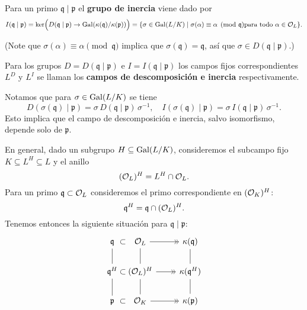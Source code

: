 \begin{definicion}
  Para un primo $\mathfrak{q} \mid \mathfrak{p}$ el \textbf{grupo de inercia}
  viene dado por
  \[ I (\mathfrak{q} \mid \mathfrak{p})
  = \ker \Bigl(D (\mathfrak{q} \mid \mathfrak{p}) \to \operatorname{Gal} (\kappa(\mathfrak{q}) / \kappa(\mathfrak{p}))\Bigr)
  = \{ \sigma \in \operatorname{Gal} (L/K) \mid \sigma (\alpha) \equiv \alpha \pmod{\mathfrak{q}}
  \text{para todo }\alpha \in \mathcal{O}_L \}. \]
\end{definicion}

\noindent (Note que $\sigma (\alpha) \equiv \alpha \pmod{\mathfrak{q}}$ implica
que $\sigma (\mathfrak{q}) = \mathfrak{q}$, así que
$\sigma \in D (\mathfrak{q} \mid \mathfrak{p})$.)

\begin{definicion}
  Para los grupos $D = D (\mathfrak{q}\mid\mathfrak{p})$ e
  $I = I (\mathfrak{q}\mid\mathfrak{p})$ los campos fijos correspondientes
  $L^D$ y $L^I$ se llaman los \textbf{campos de descomposición e inercia}
  respectivamente.
\end{definicion}

Notamos que para $\sigma \in \operatorname{Gal} (L/K)$ se tiene
\[ D (\sigma (\mathfrak{q}) \mid \mathfrak{p}) =
\sigma \, D (\mathfrak{q} \mid \mathfrak{p}) \, \sigma^{-1}, \quad
I (\sigma (\mathfrak{q}) \mid \mathfrak{p}) =
\sigma \, I (\mathfrak{q} \mid \mathfrak{p}) \, \sigma^{-1}. \]
Esto implica que el campo de descomposición e inercia, salvo isomorfismo,
depende solo de $\mathfrak{p}$.

\vspace{1em}

En general, dado un subgrupo $H \subseteq \operatorname{Gal} (L/K)$, consideremos el subcampo
fijo $K \subseteq L^H \subseteq L$ y el anillo
$$(\mathcal{O}_L)^H = L^H \cap \mathcal{O}_L.$$
Para un primo $\mathfrak{q} \subset \mathcal{O}_L$ consideremos el primo correspondiente
en $(\mathcal{O}_K)^H$:
$$\mathfrak{q}^H = \mathfrak{q} \cap (\mathcal{O}_L)^H.$$
Tenemos entonces la siguiente situación para $\mathfrak{q} \mid \mathfrak{p}$:
\[ \begin{tikzcd}
  \mathfrak{q}\ar[-]{d} &[-3em] \subset &[-3em] \O_L\ar[-]{d}\ar[->>]{r} & \kappa (\mathfrak{q}) \ar[-]{d} \\
  \mathfrak{q}^H\ar[-]{d} & \subset & (\O_L)^H \ar[-]{d}\ar[->>]{r} & \kappa (\mathfrak{q}^H) \ar[-]{d} \\
  \mathfrak{p} & \subset & \O_K \ar[->>]{r} & \kappa (\mathfrak{p})
\end{tikzcd} \]

